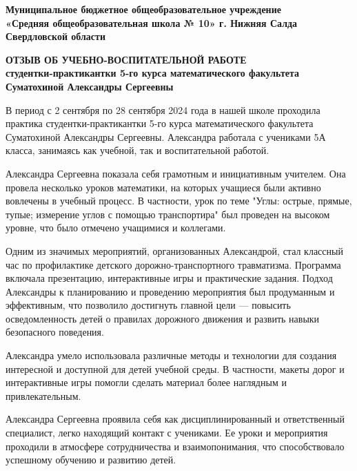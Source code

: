 \documentclass[a4paper,12pt]{article}
\begin{document}
\begin{center}
    \textbf{Муниципальное бюджетное общеобразовательное учреждение}\\
    \textbf{«Средняя общеобразовательная школа № 10» г. Нижняя Салда Свердловской области}\\
    \end{center}
\begin{center}
    \textbf{\large ОТЗЫВ ОБ УЧЕБНО-ВОСПИТАТЕЛЬНОЙ РАБОТЕ}\\
    \textbf{студентки-практикантки 5-го курса математического факультета}\\
    \textbf{Суматохиной Александры Сергеевны}
    \end{center}
\vspace{10mm}

В период с 2 сентября по 28 сентября 2024 года в нашей школе проходила практика студентки-практикантки 5-го курса математического факультета Суматохиной Александры Сергеевны. Александра работала с учениками 5А класса, занимаясь как учебной, так и воспитательной работой.

Александра Сергеевна показала себя грамотным и инициативным учителем. Она провела несколько уроков математики, на которых учащиеся были активно вовлечены в учебный процесс. В частности, урок по теме "Углы: острые, прямые, тупые; измерение углов с помощью транспортира" был проведен на высоком уровне, что было отмечено учащимися и коллегами.

Одним из значимых мероприятий, организованных Александрой, стал классный час по профилактике детского дорожно-транспортного травматизма. Программа включала презентацию, интерактивные игры и практические задания. Подход Александры к планированию и проведению мероприятия был продуманным и эффективным, что позволило достигнуть главной цели — повысить осведомленность детей о правилах дорожного движения и развить навыки безопасного поведения.

Александра умело использовала различные методы и технологии для создания интересной и доступной для детей учебной среды. В частности, макеты дорог и интерактивные игры помогли сделать материал более наглядным и привлекательным.

Александра Сергеевна проявила себя как дисциплинированный и ответственный специалист, легко находящий контакт с учениками. Ее уроки и мероприятия проходили в атмосфере сотрудничества и взаимопонимания, что способствовало успешному обучению и развитию детей.

\vspace{5mm}
\end{document}
